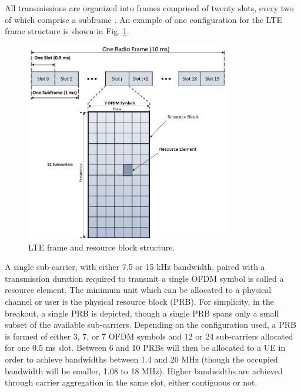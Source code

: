 All transmissions are organized into frames comprised of twenty slots, every two of which comprise a subframe \cite{tr36211}. An example of one configuration for the LTE frame structure is shown in Fig. \ref{lte:frame}.
\begin{figure}[!t]
	\centering
	\includegraphics[width=0.8\textwidth]{figures3/LTE-frame}
	\caption{LTE frame and resource block structure.}
	\label{lte:frame}
\end{figure}
A single sub-carrier, with either 7.5 or 15 kHz bandwidth, paired with a transmission duration required to transmit a single OFDM symbol is called a resource element.  The minimum unit which can be allocated to a physical channel or user is the physical resource block (PRB).  For simplicity, in the breakout, a single PRB is depicted, though a single PRB spans only a small subset of the available sub-carriers. Depending on the configuration used, a PRB is formed of either 3, 7, or 7 OFDM symbols and 12 or 24 sub-carriers allocated for one 0.5 ms slot.  Between 6 and 10 PRBs will then be allocated to a UE in order to achieve bandwidths between 1.4 and 20 MHz (though the occupied bandwidth will be smaller, 1.08 to 18 MHz).  Higher bandwidths are achieved through carrier aggregation in the same slot, either contiguous or not. 

